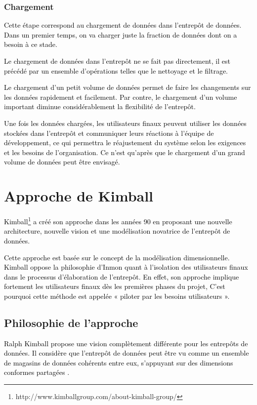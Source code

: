 \documentclass[a4paper,12pt]{report}
\begin{document}
\subsubsection{Chargement}

\textcolor{black}{Cette étape correspond au chargement de données dans l’entrepôt de données. Dans un premier temps, on va charger juste la fraction de données dont on a besoin à ce stade.}

\textcolor{black}{Le chargement de données dans l’entrepôt ne se fait pas directement, il est précédé par un ensemble d’opérations telles que le nettoyage et le filtrage.}

\textcolor{black}{Le chargement d’un petit volume de données permet de faire les changements sur les données rapidement et facilement. Par contre, le chargement d’un volume important diminue considérablement la flexibilité de l’entrepôt.}

\textcolor{black}{Une fois les données chargées, les utilisateurs finaux peuvent utiliser les données stockées dans l’entrepôt et communiquer leurs réactions à l'équipe de développement, ce qui permettra le réajustement du système selon les exigences et les besoins de l'organisation. Ce n’est qu’après que le chargement d’un grand volume de données peut être envisagé.}

\section{Approche de Kimball}

\textcolor{black}{Kimball\footnote{http://www.kimballgroup.com/about-kimball-group/} a créé son approche dans les années 90 en proposant une nouvelle architecture, nouvelle vision et une modélisation novatrice de l’entrepôt de données.}

\textcolor{black}{Cette approche est basée sur le concept de la modélisation dimensionnelle. Kimball oppose la philosophie d’Inmon quant à l’isolation des utilisateurs finaux dans le processus d’élaboration de l’entrepôt. En effet, son approche implique fortement les utilisateurs finaux dès les premières phases du projet, C’est pourquoi cette méthode est appelée « piloter par les besoins utilisateurs ».}

\subsection{Philosophie de l’approche}

\textcolor{black}{Ralph Kimball propose une vision complètement différente pour les entrepôts de données. Il considère que l’entrepôt de données peut être vu comme un ensemble de magasins de données cohérents entre eux, s’appuyant sur des dimensions conformes partagées \citep{kimball2013data}. }
\end{document}
